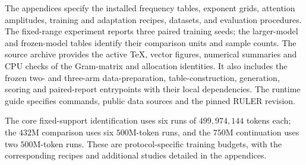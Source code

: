 The appendices specify the installed frequency tables, exponent grids, attention amplitudes, training and adaptation recipes, datasets, and evaluation procedures. The fixed-range experiment reports three paired training seeds; the larger-model and frozen-model tables identify their comparison units and sample counts. The source archive provides the active TeX, vector figures, numerical summaries and CPU checks of the Gram-matrix and allocation identities. It also includes the frozen two- and three-arm data-preparation, table-construction, generation, scoring and paired-report entrypoints with their local dependencies. The runtime guide specifies commands, public data sources and the pinned RULER revision.

The core fixed-support identification uses six runs of $499{,}974{,}144$ tokens each; the $432$M comparison uses six $500$M-token runs, and the $750$M continuation uses two $500$M-token runs. These are protocol-specific training budgets, with the corresponding recipes and additional studies detailed in the appendices.
